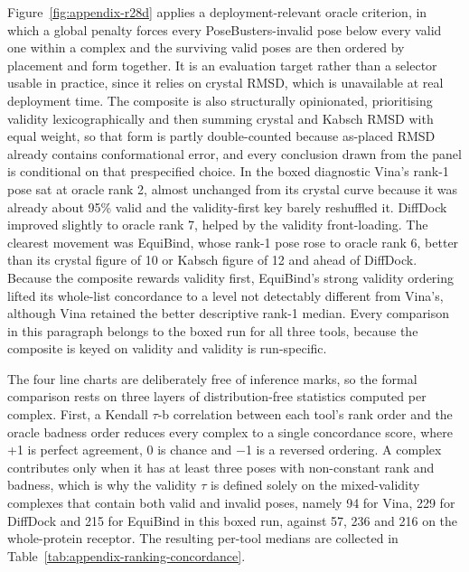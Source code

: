 Figure~\ref{fig:appendix-r28d} applies a deployment-relevant oracle criterion, in which a global penalty forces every PoseBusters-invalid pose below every valid one within a complex and the surviving valid poses are then ordered by placement and form together. It is an evaluation target rather than a selector usable in practice, since it relies on crystal RMSD, which is unavailable at real deployment time. The composite is also structurally opinionated, prioritising validity lexicographically and then summing crystal and Kabsch RMSD with equal weight, so that form is partly double-counted because as-placed RMSD already contains conformational error, and every conclusion drawn from the panel is conditional on that prespecified choice. In the boxed diagnostic Vina's rank-1 pose sat at oracle rank 2, almost unchanged from its crystal curve because it was already about 95\% valid and the validity-first key barely reshuffled it. DiffDock improved slightly to oracle rank 7, helped by the validity front-loading. The clearest movement was EquiBind, whose rank-1 pose rose to oracle rank 6, better than its crystal figure of 10 or Kabsch figure of 12 and ahead of DiffDock. Because the composite rewards validity first, EquiBind's strong validity ordering lifted its whole-list concordance to a level not detectably different from Vina's, although Vina retained the better descriptive rank-1 median. Every comparison in this paragraph belongs to the boxed run for all three tools, because the composite is keyed on validity and validity is run-specific.

The four line charts are deliberately free of inference marks, so the formal comparison rests on three layers of distribution-free statistics computed per complex. First, a Kendall \ensuremath{\tau}-b correlation between each tool's rank order and the oracle badness order reduces every complex to a single concordance score, where +1 is perfect agreement, 0 is chance and \ensuremath{-}1 is a reversed ordering. A complex contributes only when it has at least three poses with non-constant rank and badness, which is why the validity \ensuremath{\tau} is defined solely on the mixed-validity complexes that contain both valid and invalid poses, namely 94 for Vina, 229 for DiffDock and 215 for EquiBind in this boxed run, against 57, 236 and 216 on the whole-protein receptor. The resulting per-tool medians are collected in Table~\ref{tab:appendix-ranking-concordance}.

